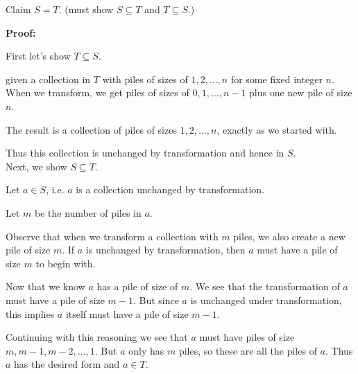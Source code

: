 \documentclass[a4paper, 11pt, twoside]{article}
\begin{document}
Claim $S=T$. (must show $S\subseteq T$ and $T \subseteq S$.)

\textbf{Proof:}

First let's show $T\subseteq S$.

given a collection in $T$ with piles of sizes of $1, 2, \dots , n$ for some fixed integer $n$. When we transform, we get piles of sizes of $0, 1, \dots , n-1$ plus one new pile of size $n$.

The result is a collection of piles of sizes $1, 2, \dots ,n$, exactly as we started with.

Thus this collection is unchanged by transformation and hence in $S$.
\\

Next, we show $S\subseteq T$.

Let $a \in S$, i.e. $a$ is a collection unchanged by transformation.

Let $m$ be the number of piles in $a$.

Observe that when we transform a collection with $m$ piles, we also create a new pile of size $m$. If $a$ is unchanged by transformation, then $a$ must have a pile of size $m$ to begin with.

Now that we know $a$ has a pile of size of $m$. We see that the transformation of $a$ must have a pile of size $m-1$. But since $a$ is unchanged under transformation, this implies $a$ itself must have a pile of size $m-1$.

Continuing with this reasoning we see that $a$ must have piles of size $m, m-1, m-2, \dots ,1$. But $a$ only has $m$ piles, so these are all the piles of $a$. Thus $a$ has the desired form and $a\in T$. 
\end{document}
